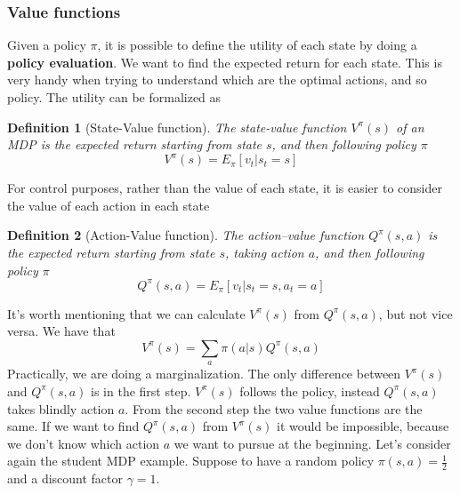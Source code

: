 \documentclass[main.tex]{subfiles}
\newtheorem{definition}{Definition}[section]
\begin{document}
\subsubsection{Value functions}
Given a policy $\pi$, it is possible to define the utility of each state by doing a \textbf{policy evaluation}. We want to find the expected return for each state. This is very handy when trying to understand which are the optimal actions, and so policy. The utility can be formalized as
\begin{definition}[State-Value function]
    The state-value function $V^{\pi}(s)$ of an MDP is the expected return starting from state $s$, and then following policy $\pi$
    \begin{equation*}
        V^{\pi}(s) = E_{\pi}[v_t|s_t=s]
    \end{equation*}
\end{definition}
For control purposes, rather than the value of each state, it is easier to consider the value of each action in each state
\begin{definition}[Action-Value function]
    The action–value function $Q^\pi(s, a)$ is the expected return starting from state $s$, taking action $a$,
    and then following policy $\pi$
    \begin{equation*}
        Q^{\pi}(s,a) = E_{\pi}[v_t|s_t=s, a_t=a]
    \end{equation*}
\end{definition}
It's worth mentioning that we can calculate $V^{\pi}(s)$ from $Q^{\pi}(s, a)$, but not vice versa. We have that
\begin{equation}
    V^{\pi}(s) = \sum_a \pi(a|s) Q^{\pi}(s,a)
\end{equation}
Practically, we are doing a marginalization\footnotemark. The only difference between $V^{\pi}(s)$ and $Q^{\pi}(s, a)$ is in the first step. $V^{\pi}(s)$ follows the policy, instead $Q^{\pi}(s, a)$ takes blindly action $a$. From the second step the two value functions are the same. If we want to find $Q^{\pi}(s, a)$ from $V^{\pi}(s)$ it would be impossible, because we don't know which action $a$ we want to pursue at the beginning.
Let's consider again the student MDP example. Suppose to have a random policy $\pi(s,a)=\frac{1}{2}$ \footnotemark{} and a discount factor $\gamma=1$.
\end{document}
